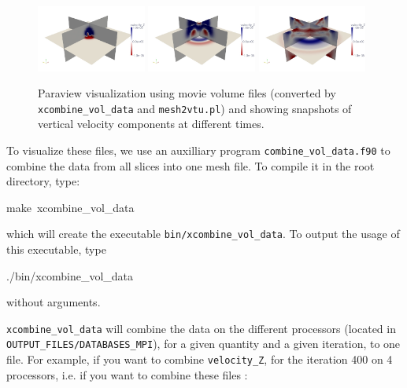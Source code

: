 \begin{figure}[htbp]
\noindent \begin{centering}
\includegraphics[width=0.32\textwidth]{figures/movie_volume_1.jpg} 
\includegraphics[width=0.32\textwidth]{figures/movie_volume_2.jpg}
\includegraphics[width=0.32\textwidth]{figures/movie_volume_3.jpg}
\par\end{centering}

\caption{Paraview visualization using movie volume files (converted by \texttt{xcombine\_vol\_data}
and \texttt{mesh2vtu.pl}) and showing snapshots of vertical velocity
components at different times.}


\label{fig:movie.volume}
\end{figure}


To visualize these files, we use an auxilliary program \texttt{combine\_vol\_data.f90}
to combine the data from all slices into one mesh file. To compile
it in the root directory, type:
\begin{lyxcode}
{\footnotesize make~xcombine\_vol\_data~}{\footnotesize \par}
\end{lyxcode}
which will create the executable \texttt{bin/xcombine\_vol\_data}.
To output the usage of this executable, type
\begin{lyxcode}
{\footnotesize ./bin/xcombine\_vol\_data~}{\footnotesize \par}
\end{lyxcode}
without arguments.

\medskip

\texttt{xcombine\_vol\_data} will combine the data on the different processors (located in \texttt{OUTPUT\_FILES/DATABASES\_MPI}), for a given quantity and a given iteration, to one file. For example, if you want to combine \texttt{velocity\_Z}, for the iteration 400 on 4 processors, i.e. if you want to combine these files :

